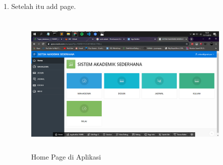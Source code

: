 \begin{enumerate}
\item  Setelah itu add page.
\begin{figure}[!htbp]
\centering
\includegraphics[width=10cm,height=7cm]{figures/end.png}
\caption{Home Page di Aplikasi}
\label{penanda}
\end{figure}
\end{enumerate}

